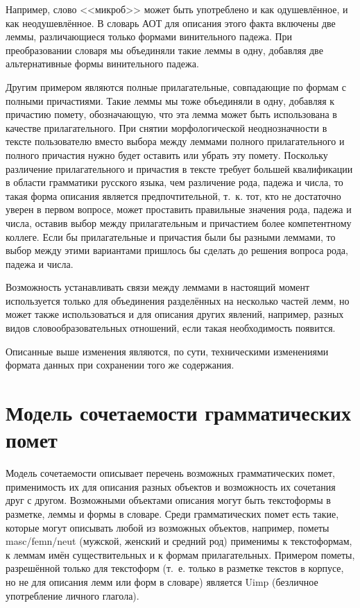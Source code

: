 \documentclass[a4paper]{article}
\begin{document}
Например, слово <<микроб>> может быть употреблено и как одушевлённое, и как неодушевлённое. В словарь АОТ для описания этого факта включены две леммы, различающиеся только формами винительного падежа. При преобразовании словаря мы объединяли такие леммы в одну, добавляя две альтернативные формы винительного падежа.

Другим примером являются полные прилагательные, совпадающие по формам с полными причастиями. Такие леммы мы тоже объединяли в одну, добавляя к причастию помету, обозначающую, что эта лемма может быть использована в качестве прилагательного. При снятии морфологической неоднозначности в тексте пользователю вместо выбора между леммами полного прилагательного и полного причастия нужно будет оставить или убрать эту помету. Поскольку различение прилагательного и причастия в тексте требует большей квалификации в области грамматики русского языка, чем различение рода, падежа и числа, то такая форма описания является предпочтительной, т.~к. тот, кто не достаточно уверен в первом вопросе, может проставить правильные значения рода, падежа и числа, оставив выбор между прилагательным и причастием более компетентному коллеге. Если бы прилагательные и причастия были бы разными леммами, то выбор между этими вариантами пришлось бы сделать до решения вопроса рода, падежа и числа.

Возможность устанавливать связи между леммами в настоящий момент используется только для объединения разделённых на несколько частей лемм, но может также использоваться и для описания других явлений, например, разных видов словообразовательных отношений, если такая необходимость появится.

Описанные выше изменения являются, по сути, техническими изменениями формата данных при сохранении того же содержания.
\section{Модель сочетаемости грамматических помет}
Модель сочетаемости описывает перечень возможных грамматических помет, применимость их для описания разных объектов и возможность их сочетания друг с другом. Возможными объектами описания могут быть текстоформы в разметке, леммы и формы в словаре. Среди грамматических помет есть такие, которые могут описывать любой из возможных объектов, например, пометы masc/femn/neut (мужской, женский и средний род) применимы к текстоформам, к леммам имён существительных и к формам прилагательных. Примером пометы, разрешённой только для текстоформ (т.~е. только в разметке текстов в корпусе, но не для описания лемм или форм в словаре) является Uimp (безличное употребление личного глагола).
\end{document}
